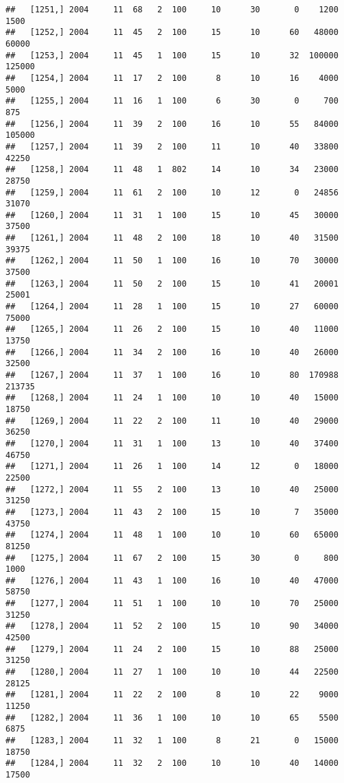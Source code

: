 \documentclass{article}\usepackage[]{graphicx}\usepackage[]{color}
\makeatletter
\newenvironment{kframe}{%
 \def\at@end@of@kframe{}%
 \ifinner\ifhmode%
  \def\at@end@of@kframe{\end{minipage}}%
  \begin{minipage}{\columnwidth}%
 \fi\fi%
 \def\FrameCommand##1{\hskip\@totalleftmargin \hskip-\fboxsep
 \colorbox{shadecolor}{##1}\hskip-\fboxsep
     \hskip-\linewidth \hskip-\@totalleftmargin \hskip\columnwidth}%
 \MakeFramed {\advance\hsize-\width
   \@totalleftmargin\z@ \linewidth\hsize
   \@setminipage}}%
 {\par\unskip\endMakeFramed%
 \at@end@of@kframe}
\newenvironment{knitrout}{}{} %
\makeatother
\begin{document}
\begin{knitrout}
\begin{kframe}
\begin{verbatim}
##   [1251,] 2004     11  68   2  100     10      30       0    1200    1500
##   [1252,] 2004     11  45   2  100     15      10      60   48000   60000
##   [1253,] 2004     11  45   1  100     15      10      32  100000  125000
##   [1254,] 2004     11  17   2  100      8      10      16    4000    5000
##   [1255,] 2004     11  16   1  100      6      30       0     700     875
##   [1256,] 2004     11  39   2  100     16      10      55   84000  105000
##   [1257,] 2004     11  39   2  100     11      10      40   33800   42250
##   [1258,] 2004     11  48   1  802     14      10      34   23000   28750
##   [1259,] 2004     11  61   2  100     10      12       0   24856   31070
##   [1260,] 2004     11  31   1  100     15      10      45   30000   37500
##   [1261,] 2004     11  48   2  100     18      10      40   31500   39375
##   [1262,] 2004     11  50   1  100     16      10      70   30000   37500
##   [1263,] 2004     11  50   2  100     15      10      41   20001   25001
##   [1264,] 2004     11  28   1  100     15      10      27   60000   75000
##   [1265,] 2004     11  26   2  100     15      10      40   11000   13750
##   [1266,] 2004     11  34   2  100     16      10      40   26000   32500
##   [1267,] 2004     11  37   1  100     16      10      80  170988  213735
##   [1268,] 2004     11  24   1  100     10      10      40   15000   18750
##   [1269,] 2004     11  22   2  100     11      10      40   29000   36250
##   [1270,] 2004     11  31   1  100     13      10      40   37400   46750
##   [1271,] 2004     11  26   1  100     14      12       0   18000   22500
##   [1272,] 2004     11  55   2  100     13      10      40   25000   31250
##   [1273,] 2004     11  43   2  100     15      10       7   35000   43750
##   [1274,] 2004     11  48   1  100     10      10      60   65000   81250
##   [1275,] 2004     11  67   2  100     15      30       0     800    1000
##   [1276,] 2004     11  43   1  100     16      10      40   47000   58750
##   [1277,] 2004     11  51   1  100     10      10      70   25000   31250
##   [1278,] 2004     11  52   2  100     15      10      90   34000   42500
##   [1279,] 2004     11  24   2  100     15      10      88   25000   31250
##   [1280,] 2004     11  27   1  100     10      10      44   22500   28125
##   [1281,] 2004     11  22   2  100      8      10      22    9000   11250
##   [1282,] 2004     11  36   1  100     10      10      65    5500    6875
##   [1283,] 2004     11  32   1  100      8      21       0   15000   18750
##   [1284,] 2004     11  32   2  100     10      10      40   14000   17500

\end{verbatim}
\end{kframe}
\end{knitrout}
\end{document}
